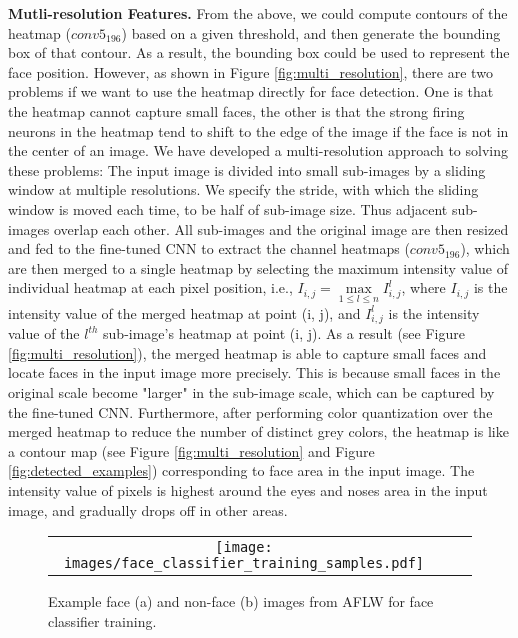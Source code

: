 \documentclass[10pt,twocolumn,letterpaper]{article}
\begin{document}
{\bf Mutli-resolution Features.} From the above, we could compute contours of the heatmap ($conv5_{196}$) based on a given threshold, and then generate the bounding box of that contour. As a result, the bounding box could be used to represent the face position. However, as shown in Figure \ref{fig:multi_resolution}, there are two problems if we want to use the heatmap directly for face detection. One is that the heatmap cannot capture small faces, the other is that the strong firing neurons in the heatmap tend to shift to the edge of the image if the face is not in the center of an image. We have developed a multi-resolution approach to solving these problems: The input image is divided into small sub-images by a sliding window at multiple resolutions. We specify the stride, with which the sliding window is moved each time, to be half of sub-image size. Thus adjacent sub-images overlap each other. All sub-images and the original image are then resized and fed to the fine-tuned CNN to extract the channel heatmaps ($conv5_{196}$), which are then merged to a single heatmap by selecting the maximum intensity value of individual heatmap at each pixel position, i.e., $I_{i, j} = \max\limits_{1\leq l\leq n} I^{l}_{i, j}$, where $I_{i, j}$ is the intensity value of the merged heatmap at point (i, j), and $I^{l}_{i, j}$ is the intensity value of the $l^{th}$ sub-image's heatmap at point (i, j). As a result (see Figure \ref{fig:multi_resolution}), the merged heatmap is able to capture small faces and locate faces in the input image more precisely. This is because small faces in the original scale become "larger" in the sub-image scale, which can be captured by the fine-tuned CNN. Furthermore, after performing color quantization \cite{verevka1996local} over the merged heatmap to reduce the number of distinct grey colors, the heatmap is like a contour map (see Figure \ref{fig:multi_resolution} and Figure \ref{fig:detected_examples}) corresponding to face area in the input image. The intensity value of pixels is highest around the eyes and noses area in the input image, and gradually drops off in other areas.




\begin{figure*}
\begin{tabular}{ccc}
\rule{0pt}{1ex}\hspace{2.24mm}\texttt{[image: images/face\_classifier\_training\_samples.pdf]}\\[-0.1pt]
\end{tabular}
\caption{Example face (a) and non-face (b) images from AFLW for face classifier training.}
\label{fig:training_example}
\end{figure*}
\end{document}
